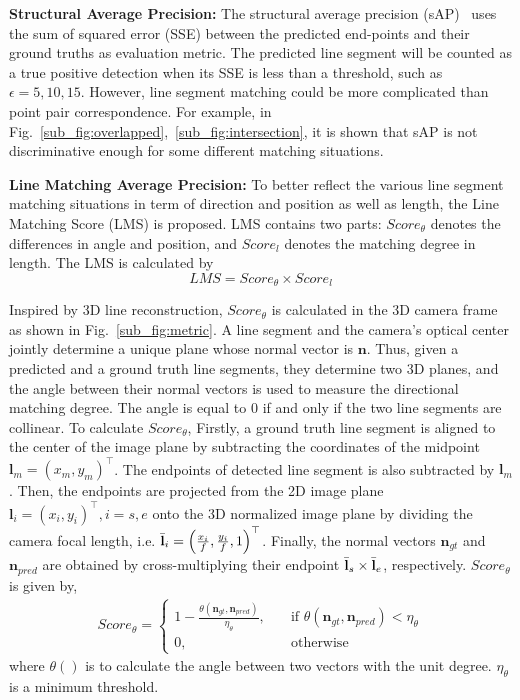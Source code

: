 \documentclass[runningheads]{llncs}
\begin{document}
\textbf{Structural Average Precision:} The structural average precision (sAP)~\cite{LCNN} uses the sum of squared error (SSE) between the predicted end-points and their ground truths as evaluation metric. The predicted line segment will be counted as a true positive detection when its SSE is less than a threshold, such as $\epsilon=5, 10, 15$. However, line segment matching could be more complicated than point pair correspondence. For example, in Fig.~\ref{sub_fig:overlapped},~\ref{sub_fig:intersection}, it is shown that sAP is not discriminative enough for some different matching situations.

\textbf{Line Matching Average Precision:}\label{line_matching_metric2}
To better reflect the various line segment matching situations in term of direction and position as well as length, the Line Matching Score (LMS) is proposed. LMS contains two parts: $Score_\theta$ denotes the differences in angle and position, and $Score_l$ denotes the matching degree in length. The LMS is calculated by \begin{equation}
  LMS = Score_\theta \times Score_l
\end{equation}

Inspired by 3D line reconstruction, $Score_\theta$ is calculated in the 3D camera frame as shown in Fig.~\ref{sub_fig:metric}. A line segment and the camera's optical center jointly determine a unique plane whose normal vector is $\mathbf{n}$.
Thus, given a predicted and a ground truth line segments, they determine two 3D planes, and the angle between their normal vectors is used to measure the directional matching degree. The angle is equal to 0 if and only if the two line segments are collinear. To calculate $Score_\theta$, Firstly, a ground truth line segment is aligned to the center of the image plane by subtracting the coordinates of the midpoint $\mathbf{l}_m = \left(x_m,y_m\right)^{\top}$. The endpoints of detected line segment is also subtracted by $\mathbf{l}_m$. Then, the endpoints are projected from the 2D image plane $\mathbf{l}_i=\left(x_i,y_i\right)^{\top},i=s,e$ onto the 3D normalized image plane by dividing the camera focal length, i.e. $\Bar{\mathbf{l}}_i=\left(\frac{x_i}{f},\frac{y_i}{f},1\right)^{\top}$. Finally, the normal vectors $\mathbf{n}_{gt}$ and $\mathbf{n}_{pred}$ are obtained by cross-multiplying their endpoint $\Bar{\mathbf{l}}_s \times \Bar{\mathbf{l}}_e$, respectively. $Score_\theta$ is given by,
\begin{align}
Score_\theta=
\begin{cases}
1-\frac{\theta(\mathbf{n}_{gt}, \mathbf{n}_{pred})}{\eta_{\theta}}, &\quad \text{if }\theta(\mathbf{n}_{gt}, \mathbf{n}_{pred}) < \eta_{\theta} \\
0, &\quad \text{otherwise}
\end{cases}
\end{align}
where $\theta\left(\right)$ is to calculate the angle between two vectors with the unit degree. $\eta_\theta$ is a minimum threshold.
\end{document}
